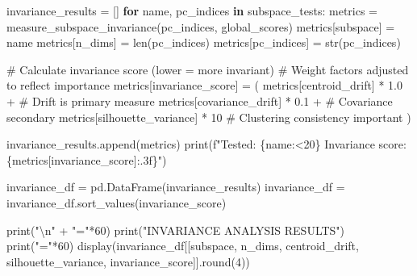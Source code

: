\documentclass[
  letterpaper,
  DIV=11,
  numbers=noendperiod]{scrartcl}
\newenvironment{Shaded}{\begin{snugshade}}{\end{snugshade}}
\newcommand{\BuiltInTok}[1]{\textcolor[rgb]{0.00,0.23,0.31}{#1}}
\newcommand{\CharTok}[1]{\textcolor[rgb]{0.13,0.47,0.30}{#1}}
\newcommand{\CommentTok}[1]{\textcolor[rgb]{0.37,0.37,0.37}{#1}}
\newcommand{\ControlFlowTok}[1]{\textcolor[rgb]{0.00,0.23,0.31}{\textbf{#1}}}
\newcommand{\DecValTok}[1]{\textcolor[rgb]{0.68,0.00,0.00}{#1}}
\newcommand{\FloatTok}[1]{\textcolor[rgb]{0.68,0.00,0.00}{#1}}
\newcommand{\KeywordTok}[1]{\textcolor[rgb]{0.00,0.23,0.31}{\textbf{#1}}}
\newcommand{\NormalTok}[1]{\textcolor[rgb]{0.00,0.23,0.31}{#1}}
\newcommand{\OperatorTok}[1]{\textcolor[rgb]{0.37,0.37,0.37}{#1}}
\newcommand{\SpecialCharTok}[1]{\textcolor[rgb]{0.37,0.37,0.37}{#1}}
\newcommand{\SpecialStringTok}[1]{\textcolor[rgb]{0.13,0.47,0.30}{#1}}
\newcommand{\StringTok}[1]{\textcolor[rgb]{0.13,0.47,0.30}{#1}}
\renewenvironment{Shaded}{%
  \begin{tcolorbox}[%
    enhanced,%
    colback=codebg,%
    colframe=codebg,%
    borderline west={3pt}{0pt}{sectionblue},%
    fontupper=\small\ttfamily,%
    boxrule=0pt,%
    arc=0pt,%
    boxsep=5pt,%
    left=2mm,%
    right=2mm,%
    top=2mm,%
    bottom=2mm%
  ]%
}{%
  \end{tcolorbox}%
}
\begin{document}
\begin{Shaded}
\begin{Highlighting}[]
\NormalTok{invariance\_results }\OperatorTok{=}\NormalTok{ []}
\ControlFlowTok{for}\NormalTok{ name, pc\_indices }\KeywordTok{in}\NormalTok{ subspace\_tests:}
\NormalTok{    metrics }\OperatorTok{=}\NormalTok{ measure\_subspace\_invariance(pc\_indices, global\_scores)}
\NormalTok{    metrics[}\StringTok{\textquotesingle{}subspace\textquotesingle{}}\NormalTok{] }\OperatorTok{=}\NormalTok{ name}
\NormalTok{    metrics[}\StringTok{\textquotesingle{}n\_dims\textquotesingle{}}\NormalTok{] }\OperatorTok{=} \BuiltInTok{len}\NormalTok{(pc\_indices)}
\NormalTok{    metrics[}\StringTok{\textquotesingle{}pc\_indices\textquotesingle{}}\NormalTok{] }\OperatorTok{=} \BuiltInTok{str}\NormalTok{(pc\_indices)}
    
    \CommentTok{\# Calculate invariance score (lower = more invariant)}
    \CommentTok{\# Weight factors adjusted to reflect importance}
\NormalTok{    metrics[}\StringTok{\textquotesingle{}invariance\_score\textquotesingle{}}\NormalTok{] }\OperatorTok{=}\NormalTok{ (}
\NormalTok{        metrics[}\StringTok{\textquotesingle{}centroid\_drift\textquotesingle{}}\NormalTok{] }\OperatorTok{*} \FloatTok{1.0} \OperatorTok{+}  \CommentTok{\# Drift is primary measure}
\NormalTok{        metrics[}\StringTok{\textquotesingle{}covariance\_drift\textquotesingle{}}\NormalTok{] }\OperatorTok{*} \FloatTok{0.1} \OperatorTok{+}  \CommentTok{\# Covariance secondary}
\NormalTok{        metrics[}\StringTok{\textquotesingle{}silhouette\_variance\textquotesingle{}}\NormalTok{] }\OperatorTok{*} \DecValTok{10}  \CommentTok{\# Clustering consistency important}
\NormalTok{    )}
    
\NormalTok{    invariance\_results.append(metrics)}
    \BuiltInTok{print}\NormalTok{(}\SpecialStringTok{f"Tested: }\SpecialCharTok{\{}\NormalTok{name}\SpecialCharTok{:\textless{}20\}}\SpecialStringTok{ Invariance score: }\SpecialCharTok{\{}\NormalTok{metrics[}\StringTok{\textquotesingle{}invariance\_score\textquotesingle{}}\NormalTok{]}\SpecialCharTok{:.3f\}}\SpecialStringTok{"}\NormalTok{)}

\NormalTok{invariance\_df }\OperatorTok{=}\NormalTok{ pd.DataFrame(invariance\_results)}
\NormalTok{invariance\_df }\OperatorTok{=}\NormalTok{ invariance\_df.sort\_values(}\StringTok{\textquotesingle{}invariance\_score\textquotesingle{}}\NormalTok{)}

\BuiltInTok{print}\NormalTok{(}\StringTok{"}\CharTok{\textbackslash{}n}\StringTok{"} \OperatorTok{+} \StringTok{"="}\OperatorTok{*}\DecValTok{60}\NormalTok{)}
\BuiltInTok{print}\NormalTok{(}\StringTok{"INVARIANCE ANALYSIS RESULTS"}\NormalTok{)}
\BuiltInTok{print}\NormalTok{(}\StringTok{"="}\OperatorTok{*}\DecValTok{60}\NormalTok{)}
\NormalTok{display(invariance\_df[[}\StringTok{\textquotesingle{}subspace\textquotesingle{}}\NormalTok{, }\StringTok{\textquotesingle{}n\_dims\textquotesingle{}}\NormalTok{, }\StringTok{\textquotesingle{}centroid\_drift\textquotesingle{}}\NormalTok{, }\StringTok{\textquotesingle{}silhouette\_variance\textquotesingle{}}\NormalTok{, }
                       \StringTok{\textquotesingle{}invariance\_score\textquotesingle{}}\NormalTok{]].}\BuiltInTok{round}\NormalTok{(}\DecValTok{4}\NormalTok{))}


\end{Highlighting}
\end{Shaded}
\end{document}
